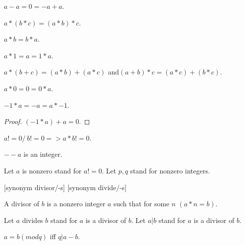 \documentclass{document}
\begin{document}
\begin{forthel}
    \begin{axiom}[AddNeg]
      $a - a = 0 = -a + a$.
    \end{axiom}

    \begin{axiom}[MulAsso]
      $a * (b * c) = (a * b) * c$.
    \end{axiom}

    \begin{axiom}[MulComm]
      $a * b = b * a$.
    \end{axiom}

    \begin{axiom}[MulOne]
      $a * 1 = a = 1 * a$.
    \end{axiom}

    \begin{axiom}[Distrib]
      $a * (b + c) = (a*b) + (a*c)$ and$ (a + b) * c = (a*c) + (b*c)$.
    \end{axiom}

    \begin{lemma}[MulZero]
      $a * 0 = 0 = 0 * a$.
    \end{lemma}

    \begin{lemma}[MulMinOne]
      $-1 * a = -a = a * -1$.
    \end{lemma}
    \begin{proof}
      $(-1 * a) + a = 0$.
    \end{proof}

    \begin{axiom}[ZeroDiv]
      $a != 0 /\ b != 0 => a * b != 0$.
    \end{axiom}

    \begin{lemma}
      $--a$ is an integer.
    \end{lemma}

    Let $a$ is nonzero stand for $a != 0$.
    Let $p,q$ stand for nonzero integers.

    [synonym divisor/-s] [synonym divide/-s]

    \begin{definition}[Divisor]
      A divisor of $b$ is a nonzero integer $a$ such that for some $n$ $(a * n = b)$.
    \end{definition}

    Let $a$ divides $b$ stand for $a$ is a divisor of $b$.
    Let $a | b$ stand for $a$ is a divisor of $b$.

    \begin{definition}[EquMod]
      $a = b (mod q)$ iff $q | a-b$.
    \end{definition}


\end{forthel}
\end{document}
